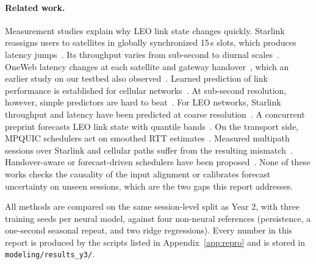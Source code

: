 \paragraph{Related work.} Measurement studies explain why LEO link state changes quickly. Starlink reassigns users to satellites in globally synchronized 15\,s slots, which produces latency jumps~\cite{mohan2024multifaceted,tanveer2023making}. Its throughput varies from sub-second to diurnal scales~\cite{garcia2023multitimescale}. OneWeb latency changes at each satellite and gateway handover~\cite{zhao2025measuring}, which an earlier study on our testbed also observed~\cite{perrin2025measurement}. Learned prediction of link performance is established for cellular networks~\cite{narayanan2020lumos5g,mei2019realtime}. At sub-second resolution, however, simple predictors are hard to beat~\cite{basit2024predictability}. For LEO networks, Starlink throughput and latency have been predicted at coarse resolution~\cite{liu2025vivisecting,benghe2026horizon}. A concurrent preprint forecasts LEO link state with quantile bands~\cite{chi2026reading}. On the transport side, MPQUIC schedulers act on smoothed RTT estimates~\cite{paasch2014experimental,lim2017ecf}. Measured multipath sessions over Starlink and cellular paths suffer from the resulting mismatch~\cite{baltaci2023multipath}. Handover-aware or forecast-driven schedulers have been proposed~\cite{yang2024mams,maglione2025intelligent}. None of these works checks the causality of the input alignment or calibrates forecast uncertainty on unseen sessions, which are the two gaps this report addresses.

All methods are compared on the same session-level split as Year 2, with three training seeds per neural model, against four non-neural references (persistence, a one-second seasonal repeat, and two ridge regressions). Every number in this report is produced by the scripts listed in Appendix~\ref{app:repro} and is stored in \texttt{modeling/\allowbreak{}results\_\allowbreak{}y3/\allowbreak{}}.
